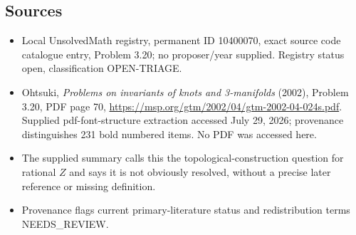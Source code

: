 \documentclass[11pt]{article}
\begin{document}
\subsection{Sources}
\begin{itemize}
\item Local UnsolvedMath registry, permanent ID 10400070, exact source code catalogue entry, Problem 3.20; no proposer/year supplied. Registry status open, classification OPEN-TRIAGE.
\item Ohtsuki, \emph{Problems on invariants of knots and 3-manifolds} (2002), Problem 3.20, PDF page 70, \url{https://msp.org/gtm/2002/04/gtm-2002-04-024s.pdf}. Supplied pdf-font-structure extraction accessed July 29, 2026; provenance distinguishes 231 bold numbered items. No PDF was accessed here.
\item The supplied summary calls this the topological-construction question for rational $Z$ and says it is not obviously resolved, without a precise later reference or missing definition.
\item Provenance flags current primary-literature status and redistribution terms NEEDS\_REVIEW.
\end{itemize}
\end{document}
